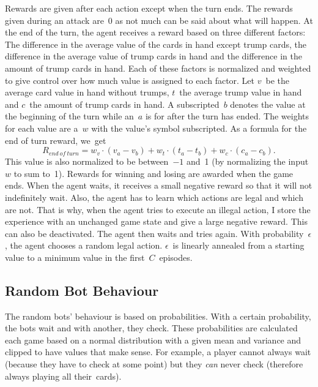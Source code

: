 \documentclass[a4paper,titlepage]{article}
\begin{document}
Rewards are given after each action except when the turn ends. The rewards given during an attack are~0 as not much can be said about what will happen. At the end of the turn, the agent receives a reward based on three different factors: The difference in the average value of the cards in hand except trump cards, the difference in the average value of trump cards in hand and the difference in the amount of trump cards in hand. Each of these factors is normalized and weighted to give control over how much value is assigned to each factor.
Let $v$~be the average card value in hand without trumps, $t$~the average trump value in hand and $c$~the amount of trump cards in hand. A subscripted~$b$ denotes the value at the beginning of the turn while an~$a$ is for after the turn has ended. The weights for each value are a~$w$ with the value's symbol subscripted. As a formula for the end of turn reward, we~get
\begin{equation*}
  R_{end\ of\ turn} = w_v \cdot (v_a - v_b) + w_t \cdot (t_a - t_b) + w_c \cdot (c_a - c_b).
\end{equation*}
This value is also normalized to be between~$-1$ and~1 (by normalizing the input~$w$ to sum to~1). Rewards for winning and losing are awarded when the game ends. When the agent waits, it receives a small negative reward so that it will not indefinitely wait. Also, the agent has to learn which actions are legal and which are not. That is why, when the agent tries to execute an illegal action, I store the experience with an unchanged game state and give a large negative reward. This can also be deactivated. The agent then waits and tries again. With probability~$\epsilon$, the agent chooses a random legal action. $\epsilon$~is linearly annealed from a starting value to a minimum value in the first~$C$~episodes.

\subsection{Random Bot Behaviour}
\label{sec:behaviour}

The random bots' behaviour is based on probabilities. With a certain probability, the bots wait and with another, they check. These probabilities are calculated each game based on a normal distribution with a given mean and variance and clipped to have values that make sense. For example, a player cannot always wait (because they have to check at some point) but they \emph{can} never check (therefore always playing all their~cards).
\end{document}
